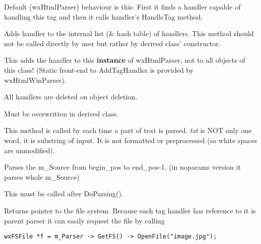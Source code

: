 Default (wxHtmlParser) behaviour is this:
First it finds a handler capable of handling this tag and then it calls
handler's HandleTag method.

\label{wxhtmlparseraddtaghandler}


Adds handler to the internal list (\& hash table) of handlers. This
method should not be called directly by user but rather by derived class'
constructor.

This adds the handler to this {\bf instance} of wxHtmlParser, not to
all objects of this class! (Static front-end to AddTagHandler is provided
by wxHtmlWinParser).

All handlers are deleted on object deletion.

\label{wxhtmlparseraddword}


Must be overwritten in derived class.

This method is called by 
each time a part of text is parsed. {\it txt} is NOT only one word, it is
substring of input. It is not formatted or preprocessed (so white spaces are
unmodified).

\label{wxhtmlparserdoparsing}



Parses the m\_Source from begin\_pos to end\_pos-1.
(in noparams version it parses whole m\_Source)

\label{wxhtmlparserdoneparser}


This must be called after DoParsing().

\label{wxhtmlparsergetfs}


Returns pointer to the file system. Because each tag handler has
reference to it is parent parser it can easily request the file by
calling

\begin{verbatim}
wxFSFile *f = m_Parser -> GetFS() -> OpenFile("image.jpg");
\end{verbatim}

